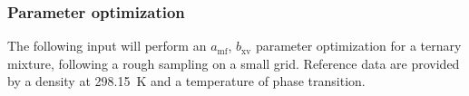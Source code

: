 \documentclass{scrartcl}
\newcommand{\amf}{a_\mathrm{mf}}
\newcommand{\bxv}{b_\mathrm{xv}}
\begin{document}
%
%
%
%
%
%
\subsubsection*{Parameter optimization}\vspace{-0.3cm}
The following input will perform an $\amf$, $\bxv$ parameter optimization for a ternary mixture, following a 
rough sampling on a small grid.
Reference data are provided by a density at \SI{298.15}{K} and a temperature of phase transition.
\end{document}
